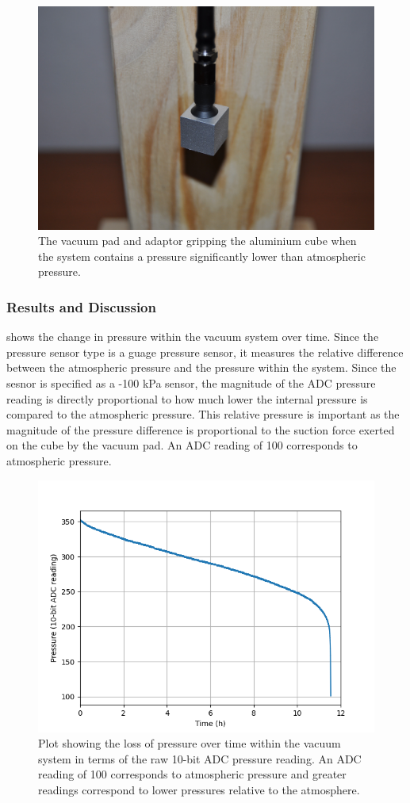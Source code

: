 \begin{figure}[!ht]
  \centering
  \includegraphics[width=0.6\linewidth]{figures/202105/end-effector-cube-grip.jpg}
  \caption{The vacuum pad and adaptor gripping the aluminium cube when the system contains a pressure significantly lower than atmospheric pressure.}
  \label{fig:end-effector-cube-grip}
\end{figure}

\subsubsection{Results and Discussion}

 shows the change in pressure within the vacuum system over time. Since the pressure sensor type is a guage pressure sensor, it measures the relative difference between the atmospheric pressure and the pressure within the system. Since the sesnor is specified as a -100 kPa sensor, the magnitude of the ADC pressure reading is directly proportional to how much lower the internal pressure is compared to the atmospheric pressure. This relative pressure is important as the magnitude of the pressure difference is proportional to the suction force exerted on the cube by the vacuum pad. An ADC reading of 100 corresponds to atmospheric pressure. 

\begin{figure}[!ht]
    \centering
    \includegraphics[width=0.7\linewidth]{figures/202105/end-effector-pressure-leak.png}
    \caption{Plot showing the loss of pressure over time within the vacuum system in terms of the raw 10-bit ADC pressure reading. An ADC reading of 100 corresponds to atmospheric pressure and greater readings correspond to lower pressures relative to the atmosphere.}
    \label{fig:end-effector-pressure-leak}
\end{figure}

